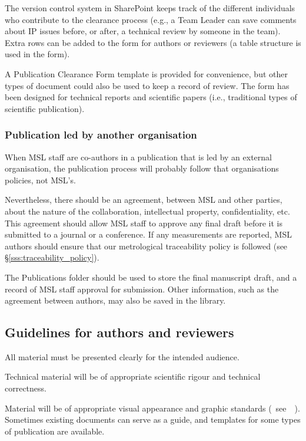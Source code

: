 The version control system in SharePoint keeps track of the different individuals who contribute to the clearance process (e.g., a Team Leader can save comments about IP issues before, or after, a technical review by someone in the team). Extra rows can be added to the form for authors or reviewers (a table structure is used in the form).

A Publication Clearance Form template is provided for convenience, but other types of document could also be used to keep a record of review. The form has been designed for technical reports and scientific papers (i.e., traditional types of scientific publication).  

\subsubsection{Publication led by another organisation}

When MSL staff are co-authors in a publication that is led by an external organisation, the publication process will probably follow that organisations policies, not MSL's. 

Nevertheless, there should be an agreement, between MSL and other parties, about the nature of the collaboration, intellectual property, confidentiality, etc. This agreement should allow MSL staff to approve any final draft before it is submitted to a journal or a conference. If any measurements are reported, MSL authors should ensure that our metrological traceability policy is followed (see \S\ref{sss:traceability_policy}).

The Publications folder should be used to store the final manuscript draft, and a record of MSL staff approval for submission. Other information, such as the agreement between authors, may also be saved in the library. 

\subsection{Guidelines for authors and reviewers}
All material must be presented clearly for the intended audience.

Technical material will be of appropriate scientific rigour and technical correctness. 

Material will be of appropriate visual appearance and graphic standards (~see~\cite[\S\ref*{GRP-s:scientific_documents}]{MSL_Reporting_Guidelines}~). Sometimes existing documents can serve as a guide, and templates for some types of publication are available.  

